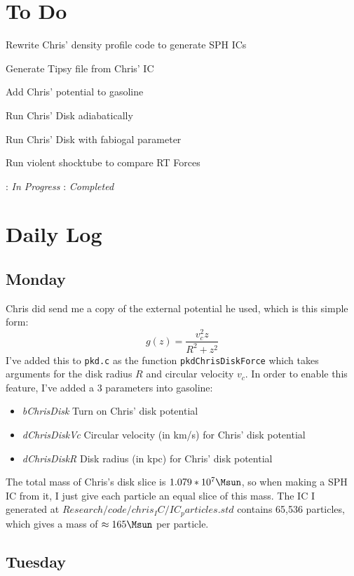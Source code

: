 \documentclass[11pt,letterpaper]{article}
\begin{document}
\section{To Do}
\begin{bullets}
\item[\checkmark] Rewrite Chris' density profile code to generate SPH ICs
\item[\checkmark] Generate Tipsy file from Chris' IC
\item Add Chris' potential to gasoline
\item Run Chris' Disk adiabatically
\item Run Chris' Disk with fabiogal parameter
\item Run violent shocktube to compare RT Forces
\end{bullets}

\textleaf : \textit{In Progress} \qquad \checkmark : \textit{Completed}
\section{Daily Log}

\subsection{Monday}

Chris did send me a copy of the external potential he used, which is
this simple form: \[ g(z) = \frac{v_c^2z}{R^2+z^2}\] I've added this to
\texttt{pkd.c} as the function \texttt{pkdChrisDiskForce} which takes
arguments for the disk radius $R$ and circular velocity $v_c$. In order
to enable this feature, I've added a 3 parameters into gasoline:

\begin{itemize}
\item
  \emph{bChrisDisk} Turn on Chris' disk potential
\item
  \emph{dChrisDiskVc} Circular velocity (in km/s) for Chris' disk
  potential
\item
  \emph{dChrisDiskR} Disk radius (in kpc) for Chris' disk potential
\end{itemize}

The total mass of Chris's disk slice is $1.079*10^7\Msun$, so when
making a SPH IC from it, I just give each particle an equal slice of
this mass. The IC I generated at
$Research/code/chris_IC/IC_particles.std$ contains 65,536 particles,
which gives a mass of $\approx165\Msun$ per particle.

\subsection{Tuesday}
\end{document}

